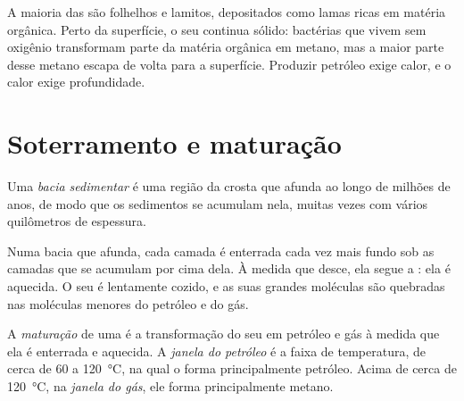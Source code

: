 A maioria das  são folhelhos e lamitos, depositados como
lamas ricas em matéria orgânica. Perto da superfície, o seu 
continua sólido: bactérias que vivem sem oxigênio transformam parte da
matéria orgânica em metano, mas a maior parte desse metano escapa de volta
para a superfície. Produzir petróleo exige calor, e o calor exige profundidade.

\section{Soterramento e maturação}

\begin{definition}\label{def:g11:fossil-fuel-geology:basin}
Uma \emph{bacia sedimentar} é uma região da crosta
que afunda ao longo de milhões de anos, de modo que os sedimentos se
acumulam nela, muitas vezes com vários quilômetros de espessura.
\end{definition}

Numa bacia que afunda, cada camada é enterrada cada vez mais fundo sob as
camadas que se acumulam por cima dela. À medida que desce, ela segue a
: ela é aquecida. O seu  é lentamente cozido, e as suas
grandes moléculas são quebradas nas moléculas menores do petróleo e do gás.

\begin{definition}\label{def:g11:fossil-fuel-geology:oil-window}
A \emph{maturação} de uma  é a
transformação do seu  em petróleo e gás à medida que ela é
enterrada e aquecida. A \emph{janela do petróleo} é a faixa de
temperatura, de cerca de 60 a \qty{120}{\degreeCelsius}, na qual o
 forma principalmente petróleo. Acima de cerca de
\qty{120}{\degreeCelsius}, na \emph{janela do
gás}, ele forma principalmente metano.
\end{definition}

